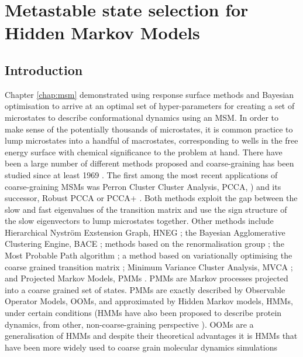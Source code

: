 \let\textcircled=\pgftextcircled
\chapter{Metastable state selection for Hidden Markov Models}
\label{chap:hmm}

\section{Introduction}
Chapter \ref{chap:msm} demonstrated using response surface methods and Bayesian optimisation to arrive at an optimal set of hyper-parameters for creating a set of microstates to describe conformational dynamics using an MSM. In order to make sense of the potentially thousands of microstates, it is common practice to lump microstates into a handful of macrostates, corresponding to wells in the free energy surface with chemical significance to the problem at hand. There have been a large number of different methods proposed and coarse-graining has been studied since at least 1969 \cite{kuoLumpingAnalysisMonomolecular}\cite{weiLumpingAnalysisMonomolecular1969}. The first among the most recent applications of coarse-graining MSMs was Perron Cluster Cluster Analysis, PCCA, \cite{deuflhardIdentificationAlmostInvariant2000a}) and its successor, Robust PCCA or PCCA+ \cite{deuflhardRobustPerronCluster2005b}. Both methods exploit the gap between the slow and fast eigenvalues of the transition matrix and use the sign structure of the slow eigenvectors to lump microstates together. Other methods include Hierarchical Nystr{\"o}m Exstension Graph, HNEG \cite{yaoHierarchicalNystromMethods2013a}; the Bayesian Agglomerative Clustering Engine, BACE \cite{bowmanImprovedCoarsegrainingMarkov2012a}; methods based on the renormalisation group \cite{orioliDimensionalReductionMarkov2016c}\cite{hummerOptimalDimensionalityReduction2015a}; the Most Probable Path algorithm \cite{jainIdentifyingMetastableStates2012a}; a method based on variationally optimising the coarse grained transition matrix \cite{martiniVariationalIdentificationMarkovian2017a};  Minimum Variance Cluster Analysis, MVCA \cite{husicMinimumVarianceClustering2018}; and Projected Markov Models, PMMs \cite{noeProjectedHiddenMarkov2013a}. PMMs are Markov processes projected into a coarse grained set of states. PMMs are exactly described by Observable Operator Models, OOMs, \cite{wuProjectedMetastableMarkov2015} and approximated by Hidden Markov models, HMMs, \cite{noeProjectedHiddenMarkov2013a} under certain conditions (HMMs have also been proposed to describe protein dynamics, from other,  non-coarse-graining perspective \cite{mcgibbonUnderstandingProteinDynamics}). OOMs are a generalisation of HMMs \cite{jaegerDiscretetimeDiscretevaluedObservable} and despite their theoretical advantages it is HMMs that have been more widely used to coarse grain molecular dynamics simulations 